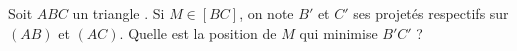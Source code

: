 Soit $ABC$ un triangle . Si $M \in [BC]$, on note $B'$ et $C'$ ses projetés respectifs sur $(AB)$ et $(AC)$. Quelle est la position de $M$ qui minimise $B'C'$ ?

